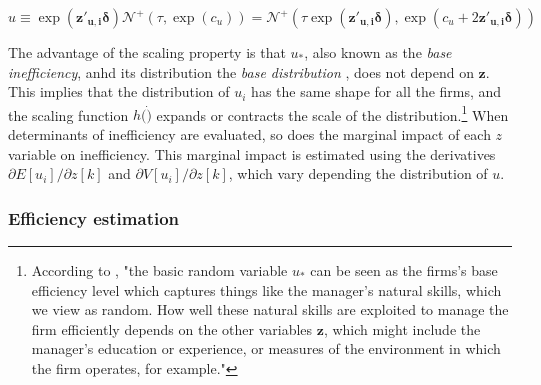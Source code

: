 \documentclass[nojss]{jss}
\begin{document}
$$u \equiv \exp\left(\mathbf{z'_{u,i}}\bm\delta\right)\mathcal{N}^+
\left(\tau, \exp{\left(c_u\right)}\right)=\mathcal{N}^+\left(\tau\exp\left(
\mathbf{z'_{u,i}}\bm\delta\right), \exp{\left(c_u + 2\mathbf{z'_{u,i}}
\bm\delta\right)}\right)$$

The advantage of the scaling property is that $u_*$, also known as the \textit{base
inefficiency}, anhd its distribution the \textit{base distribution}
\citep{wang02, al06}, does not depend on $\mathbf{z}$. This implies
that the distribution of $u_i$ has the same shape for all the firms, and the 
scaling function $h(\dot)$ expands or contracts the scale of the 
distribution.\footnote{According to \citet[p.~203]{al06}, "the basic random 
variable $u_*$ can be seen as the firms's base efficiency level which captures 
things like the manager's natural skills, which we view as random. How well 
these natural skills are exploited to manage the firm efficiently depends on the 
other variables $\mathbf{z}$, which might include the manager's education or 
experience, or measures of the environment in which the firm operates, for example."} 
When determinants of inefficiency are evaluated, so does the marginal impact of 
each $z$ variable on inefficiency. This marginal impact is estimated using the
derivatives $\partial E\left[u_i\right]/\partial z\left[k\right]$ and
$\partial V\left[u_i\right]/\partial z\left[k\right]$, which vary 
depending the distribution of $u$.



\subsubsection{Efficiency estimation} 
\end{document}
